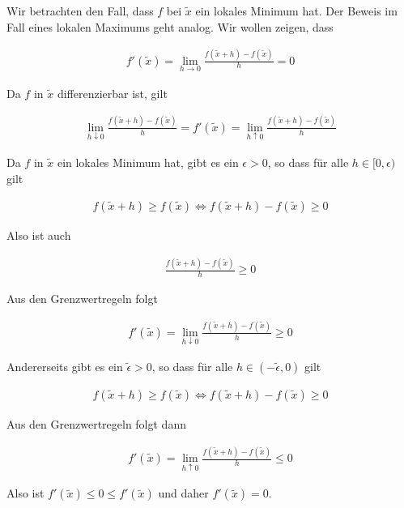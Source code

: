 \documentclass[fontsize=9pt,
               parskip=half-,
               DIV=14,
               listof=chapterentry,
               tocflat]{scrbook}
\begin{document}
\begin{proof*}
Wir betrachten den Fall, dass $f$ bei ${\tilde {x}}$ ein lokales Minimum hat. Der Beweis im Fall eines lokalen Maximums geht analog. Wir wollen zeigen, dass

\begin{align*}
f'({\tilde {x}})=\lim _{h\to 0}{\frac {f({\tilde {x}}+h)-f({\tilde {x}})}{h}}=0
\end{align*}

Da $f$ in ${\tilde {x}}$ differenzierbar ist, gilt

\begin{align*}
\lim _{h\downarrow 0}{\frac {f({\tilde {x}}+h)-f({\tilde {x}})}{h}}=f'({\tilde {x}})=\lim _{h\uparrow 0}{\frac {f({\tilde {x}}+h)-f({\tilde {x}})}{h}}
\end{align*}

Da $f$ in ${\tilde {x}}$ ein lokales Minimum hat, gibt es ein $\epsilon >0$, so dass für alle $h\in [0,\epsilon )$ gilt

\begin{align*}
f({\tilde {x}}+h)\geq f({\tilde {x}})\iff f({\tilde {x}}+h)-f({\tilde {x}})\geq 0
\end{align*}

Also ist auch

\begin{align*}
{\frac {f({\tilde {x}}+h)-f({\tilde {x}})}{h}}\geq 0
\end{align*}

Aus den Grenzwertregeln folgt

\begin{align*}
f'({\tilde {x}})=\lim _{h\downarrow 0}{\frac {f({\tilde {x}}+h)-f({\tilde {x}})}{h}}\geq 0
\end{align*}

Andererseits gibt es ein ${\tilde {\epsilon }}>0$, so dass für alle $h\in (-{\tilde {\epsilon }},0)$ gilt

\begin{align*}
f({\tilde {x}}+h)\geq f({\tilde {x}})\iff f({\tilde {x}}+h)-f({\tilde {x}})\geq 0
\end{align*}

Aus den Grenzwertregeln folgt dann

\begin{align*}
f'({\tilde {x}})=\lim _{h\uparrow 0}{\frac {f({\tilde {x}}+h)-f({\tilde {x}})}{h}}\leq 0
\end{align*}

Also ist $f'({\tilde {x}})\leq 0\leq f'({\tilde {x}})$ und daher $f'({\tilde {x}})=0$.

\end{proof*}
\end{document}
